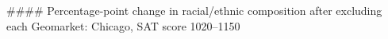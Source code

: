 #### Percentage-point change in racial/ethnic composition after excluding each Geomarket: Chicago, SAT score 1020–1150
